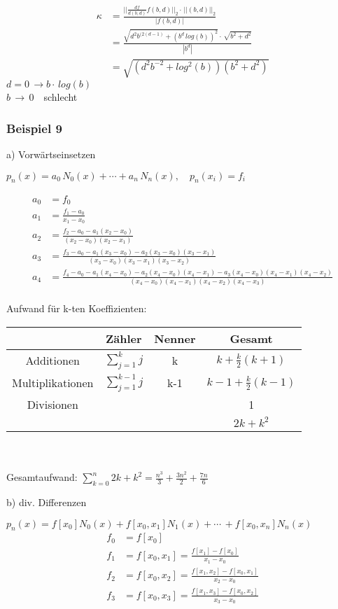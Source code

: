\begin{align*}
\kappa &=\frac{||\frac{df}{d(b,d)}f(b,d)||_2\cdot\,||(b,d)||_2}{|f(b,d)|} \\
&= \frac{\sqrt{d^2b^{(2(d-1)}+(b^d\,log(b))^2}\cdot\,\sqrt{b^2+d^2}}{|b^d|}\\
&= \sqrt{(d^2b^{-2}+log^2(b))(b^2+d^2)}
\end{align*}
$d=0\,\rightarrow b\cdot\,log(b)$\\
$b\,\rightarrow\,0\quad$schlecht

\subsubsection{Beispiel 9}
a) Vorwärtseinsetzen

$p_n(x) = a_0\,N_0(x) + \cdots + a_n\,N_n(x), \quad p_n(x_i)=f_i$

\begin{align*}
a_0 &= f_0 \\
a_1 &= \frac{f_1 - a_0}{x_1 - x_0} \\
a_2 &= \frac{f_2-a_0-a_1(x_2-x_0)}{(x_2-x_0)(x_2-x_1)} \\
a_3 &= \frac{f_3-a_0-a_1(x_3-x_0)-a_2(x_3-x_0)(x_3-x_1)}{(x_3-x_0)(x_3-x_1)(x_3-x_2)} \\
a_4 &= \frac{f_4-a_0-a_1(x_4-x_0)-a_2(x_4-x_0)(x_4-x_1)-a_3(x_4-x_0)(x_4-x_1)(x_4-x_2)}{(x_4-x_0)(x_4-x_1)(x_4-x_2)(x_4-x_3)} \\
\end{align*}

Aufwand für k-ten Koeffizienten: \\
\begin{tabular}{cccc}
 & Zähler & Nenner & Gesamt\\\hline
Additionen & $\sum\limits_{j=1}^{k}{j}$ & k & $k + \frac{k}{2}(k+1)$ \\\hline
Multiplikationen & $\sum\limits_{j=1}^{k-1}{j}$ & k-1 & $k-1 + \frac{k}{2}(k-1)$\\\hline
Divisionen &  &  & 1 \\\hline
& & & $2k+k^2$ \\\hline\hline
\end{tabular}\\
\vspace{0.5cm}\\
Gesamtaufwand: $\sum\limits_{k=0}^{n}{2k+k^2} = \frac{n^3}{3}+\frac{3n^2}{2}+\frac{7n}{6}$ 

b) div. Differenzen

$p_n(x)=f[x_0]N_0(x)+f[x_0,x_1]N_1(x)+\cdots\,+f[x_0,x_n]N_n(x)$
\begin{align*}
f_0 &= f[x_0] \\
f_1 &= f[x_0,x_1] = \frac{f[x_1]-f[x_0]}{x_1-x_0} \\
f_2 &= f[x_0,x_2] = \frac{f[x_1,x_2]-f[x_0,x_1]}{x_2-x_0} \\
f_3 &= f[x_0,x_3] = \frac{f[x_1,x_3]-f[x_0,x_2]}{x_3-x_0} 
\end{align*}

